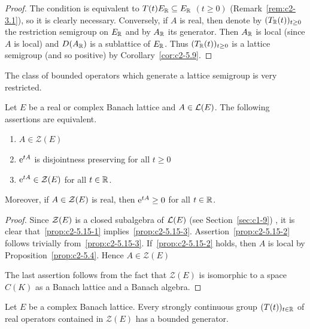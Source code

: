 \begin{proof}
The condition is equivalent to $T(t)E_{\mathbb{R}} \subseteq E_{\mathbb{R}}$ $(t \geq 0)$ (\cf Remark~\ref{rem:c2-3.1}), so it is clearly necessary.
Conversely, if\/ $A$ is real, then denote by $(T_{\R}(t))_{t \geq 0}$ the restriction semigroup on $E_{\mathbb{R}}$ and by $A_{\mathbb{R}}$ its generator.
Then $A_{\mathbb{R}}$ is local (since $A$ is local) and $D(A_{\mathbb{R}})$ is a sublattice of\/ $E_{\mathbb{R}}$.
Thus $(T_{\R}(t))_{t \geq 0}$ is a lattice semigroup (and so positive) by Corollary~\ref{cor:c2-5.9}.
\end{proof}
The class of bounded operators which generate a lattice semigroup is very restricted.
\begin{proposition}\label{prop:c2-5.15}
%
Let $E$ be a real or complex Banach lattice and $A \in \mathcal{L}(E)$. 
The following assertions are equivalent.
\begin{enumerate}[\upshape (a)]
\item \label{prop:c2-5.15-1}
$A \in \mathcal{Z}(E)$
\item \label{prop:c2-5.15-2}
$\mathrm{e}^{tA}$ is disjointness preserving for all $t \geq 0$
\item \label{prop:c2-5.15-3}
$\mathrm{e}^{tA} \in \mathcal{Z}(E)$ for all $t \in \mathbb{R}$.
\end{enumerate}
Moreover, if\/ $A \in \mathcal{Z}(E)$ is real, then $\eu^{tA} \geq 0$ for all $t \in \mathbb{R}$.
\end{proposition}
\begin{proof}
Since $\mathcal{Z}(E)$ is a closed subalgebra of\/ $\mathcal{L}(E)$ (see Section~\ref{sec:c1-9})
, it is clear that~\ref{prop:c2-5.15-1}   implies~\ref{prop:c2-5.15-3}.
Assertion~\ref{prop:c2-5.15-2}  follows trivially from~\ref{prop:c2-5.15-3}.
If~\ref{prop:c2-5.15-2}   holds, then $A$ is local by  Proposition~\ref{prop:c2-5.4}.
Hence $A \in \mathcal{Z}(E)$

The last assertion follows from the fact that $\mathcal{Z}(E)$ is isomorphic to a space $C(K)$ as a Banach lattice and a Banach algebra.
\end{proof}
\begin{proposition}\label{prop:c2-5.16}
%
Let $E$ be a complex Banach lattice.
Every strongly continuous group $(T(t))_{t \in \mathbb{R}}$ of real operators contained in $\mathcal{Z}(E)$ has a bounded generator.
\end{proposition}

